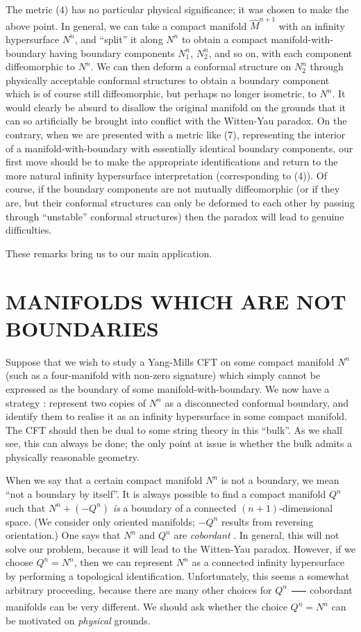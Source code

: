 \documentclass[a4paper,12pt]{article}
\theoremstyle{definition}
\renewcommand{\u}{\textit}
\renewcommand{\-}{$\dfrac{\quad\enspace}{\quad}$}
\begin{document}
The metric (4) has no particular physical significance; it was chosen to make the above point. In general, we can take a compact manifold $\hat{M}^{n+1}$ with an infinity hypersurface $N^n$, and ``split'' it along $N^n$ to obtain a compact manifold-with-boundary having boundary components $N^n_1$, $N^n_2$, and so on, with each component diffeomorphic to $N^n$. We can then deform a conformal structure on $N^n_2$ through physically acceptable conformal structures to obtain a boundary component which is of course still diffeomorphic, but perhaps no longer isometric, to $N^n$. It would clearly be absurd to disallow the original manifold on the grounds that it can so artificially be brought into conflict with the Witten-Yau paradox. On the contrary, when we are presented with a metric like (7), representing the interior of a manifold-with-boundary with essentially identical boundary components, our first move should be to make the appropriate identifications and return to the more natural infinity hypersurface interpretation (corresponding to (4)). Of course, if the boundary components are not mutually diffeomorphic (or if they are, but their conformal structures can only be deformed to each other by passing through ``unstable'' conformal structures) then the paradox will lead to genuine difficulties.

These remarks bring us to our main application.

\section{\large MANIFOLDS WHICH ARE NOT BOUNDARIES}

Suppose that we wish to study a Yang-Mills CFT  on some compact manifold $N^n$ (such as a four-manifold with non-zero signature) which simply cannot be expressed as the boundary of some manifold-with-boundary. We now have a strategy : represent two copies of $N^n$ as a disconnected conformal boundary, and identify them to realise it as an infinity hypersurface in some compact manifold. The CFT should then be dual to some string theory in this ``bulk''. As we shall see, this can always be done; the only point at issue is whether the bulk admits a physically reasonable geometry.

When we say that a certain compact manifold $N^n$ is not a boundary, we mean ``not a boundary by itself''. It is always possible to find a compact manifold $Q^n$ such that $N^n+(-Q^n)$ \u{is} a boundary of a connected $(n+1)$-dimensional space. (We consider only oriented manifolds; $-Q^n$ results from reversing orientation.) One says that $N^n$ and $Q^n$ are \u{cobordant} \cite{17}. In general, this will not solve our problem, because it will lead to the Witten-Yau paradox. However, if we choose $Q^n=N^n$, then we can represent $N^n$ as a connected infinity hypersurface by performing a topological identification. Unfortunately, this seems a somewhat arbitrary proceeding, because there are many other choices for $Q^n$ \- cobordant manifolds can be very different. We should ask whether the choice $Q^n=N^n$ can be motivated on \u{physical} grounds.
\end{document}
